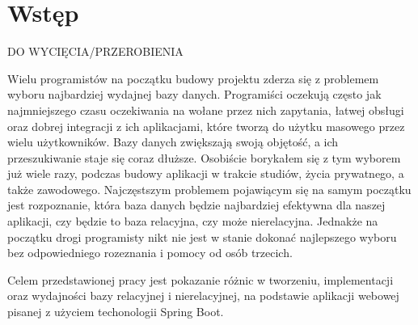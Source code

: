 \chapter*{Wstęp}


DO WYCIĘCIA/PRZEROBIENIA

Wielu programistów na początku budowy projektu zderza się z problemem wyboru najbardziej wydajnej bazy danych. Programiści oczekują często jak najmniejszego czasu oczekiwania na wołane przez nich zapytania, łatwej obsługi oraz dobrej integracji z ich aplikacjami, które tworzą do użytku masowego przez wielu użytkowników. Bazy danych zwiększają swoją objętość, a  ich przeszukiwanie staje się coraz dłuższe. Osobiście borykałem się z tym wyborem już wiele razy, podczas budowy aplikacji w trakcie studiów, życia prywatnego, a także zawodowego. Najczęstszym problemem pojawiącym się na samym początku jest rozpoznanie, która baza danych będzie najbardziej efektywna dla naszej aplikacji, czy będzie to baza relacyjna, czy może nierelacyjna. Jednakże na początku drogi programisty nikt nie jest w stanie dokonać najlepszego wyboru bez odpowiedniego rozeznania i pomocy od osób trzecich.

Celem przedstawionej pracy jest pokazanie różnic w tworzeniu, implementacji oraz wydajności bazy relacyjnej i nierelacyjnej, na podstawie aplikacji webowej pisanej z użyciem techonologii Spring Boot. 

